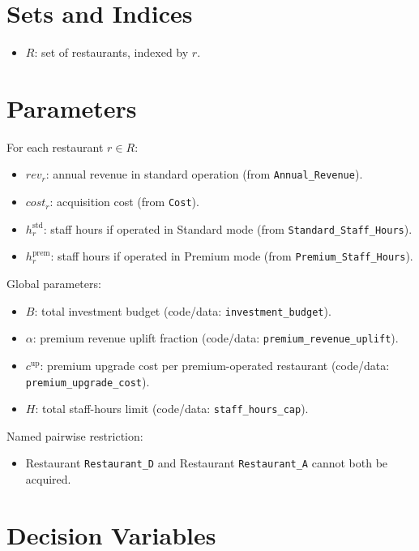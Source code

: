 \section*{Sets and Indices}

\begin{itemize}
    \item $R$: set of restaurants, indexed by $r$.
\end{itemize}

\section*{Parameters}

For each restaurant $r \in R$:
\begin{itemize}
    \item $rev_r$: annual revenue in standard operation (from \texttt{Annual\_Revenue}).
    \item $cost_r$: acquisition cost (from \texttt{Cost}).
    \item $h^{\mathrm{std}}_r$: staff hours if operated in Standard mode (from \texttt{Standard\_Staff\_Hours}).
    \item $h^{\mathrm{prem}}_r$: staff hours if operated in Premium mode (from \texttt{Premium\_Staff\_Hours}).
\end{itemize}

Global parameters:
\begin{itemize}
    \item $B$: total investment budget (code/data: \texttt{investment\_budget}).
    \item $\alpha$: premium revenue uplift fraction (code/data: \texttt{premium\_revenue\_uplift}).
    \item $c^{\mathrm{up}}$: premium upgrade cost per premium-operated restaurant (code/data: \texttt{premium\_upgrade\_cost}).
    \item $H$: total staff-hours limit (code/data: \texttt{staff\_hours\_cap}).
\end{itemize}

Named pairwise restriction:
\begin{itemize}
    \item Restaurant \texttt{Restaurant\_D} and Restaurant \texttt{Restaurant\_A} cannot both be acquired.
\end{itemize}

\section*{Decision Variables}

